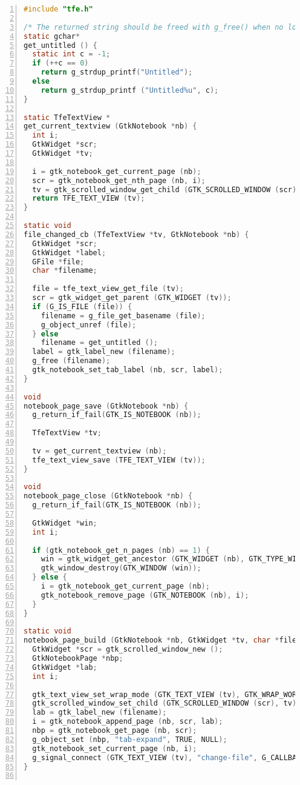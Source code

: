 \begin{lstlisting}[language=C, numbers=left]
#include "tfe.h"

/* The returned string should be freed with g_free() when no longer needed. */
static gchar*
get_untitled () {
  static int c = -1;
  if (++c == 0) 
    return g_strdup_printf("Untitled");
  else
    return g_strdup_printf ("Untitled%u", c);
}

static TfeTextView *
get_current_textview (GtkNotebook *nb) {
  int i;
  GtkWidget *scr;
  GtkWidget *tv;

  i = gtk_notebook_get_current_page (nb);
  scr = gtk_notebook_get_nth_page (nb, i);
  tv = gtk_scrolled_window_get_child (GTK_SCROLLED_WINDOW (scr));
  return TFE_TEXT_VIEW (tv);
}

static void
file_changed_cb (TfeTextView *tv, GtkNotebook *nb) {
  GtkWidget *scr;
  GtkWidget *label;
  GFile *file;
  char *filename;

  file = tfe_text_view_get_file (tv);
  scr = gtk_widget_get_parent (GTK_WIDGET (tv));
  if (G_IS_FILE (file)) {
    filename = g_file_get_basename (file);
    g_object_unref (file);
  } else
    filename = get_untitled ();
  label = gtk_label_new (filename);
  g_free (filename);
  gtk_notebook_set_tab_label (nb, scr, label);
}

void
notebook_page_save (GtkNotebook *nb) {
  g_return_if_fail(GTK_IS_NOTEBOOK (nb));

  TfeTextView *tv;

  tv = get_current_textview (nb);
  tfe_text_view_save (TFE_TEXT_VIEW (tv));
}

void
notebook_page_close (GtkNotebook *nb) {
  g_return_if_fail(GTK_IS_NOTEBOOK (nb));

  GtkWidget *win;
  int i;

  if (gtk_notebook_get_n_pages (nb) == 1) {
    win = gtk_widget_get_ancestor (GTK_WIDGET (nb), GTK_TYPE_WINDOW);
    gtk_window_destroy(GTK_WINDOW (win));
  } else {
    i = gtk_notebook_get_current_page (nb);
    gtk_notebook_remove_page (GTK_NOTEBOOK (nb), i);
  }
}

static void
notebook_page_build (GtkNotebook *nb, GtkWidget *tv, char *filename) {
  GtkWidget *scr = gtk_scrolled_window_new ();
  GtkNotebookPage *nbp;
  GtkWidget *lab;
  int i;

  gtk_text_view_set_wrap_mode (GTK_TEXT_VIEW (tv), GTK_WRAP_WORD_CHAR);
  gtk_scrolled_window_set_child (GTK_SCROLLED_WINDOW (scr), tv);
  lab = gtk_label_new (filename);
  i = gtk_notebook_append_page (nb, scr, lab);
  nbp = gtk_notebook_get_page (nb, scr);
  g_object_set (nbp, "tab-expand", TRUE, NULL);
  gtk_notebook_set_current_page (nb, i);
  g_signal_connect (GTK_TEXT_VIEW (tv), "change-file", G_CALLBACK (file_changed_cb), nb);
}


\end{lstlisting}
